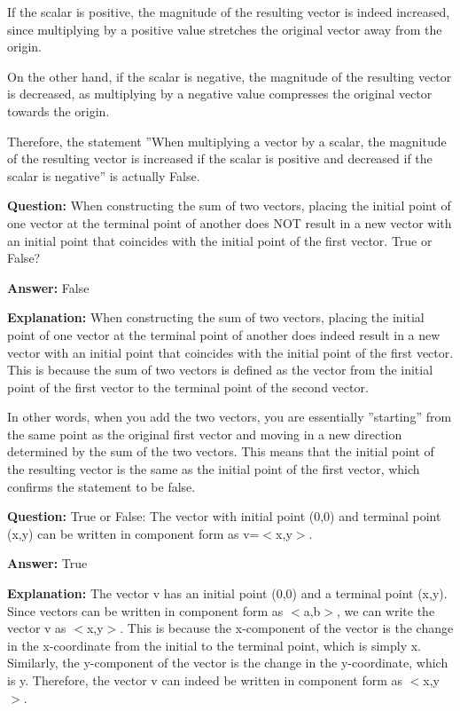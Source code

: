 \documentclass{article}
\begin{document}
If the scalar is positive, the magnitude of the resulting vector is indeed increased, since multiplying by a positive value stretches the original vector away from the origin.

On the other hand, if the scalar is negative, the magnitude of the resulting vector is decreased, as multiplying by a negative value compresses the original vector towards the origin.

Therefore, the statement ''When multiplying a vector by a scalar, the magnitude of the resulting vector is increased if the scalar is positive and decreased if the scalar is negative'' is actually False.
                
                \vspace{0.5cm} 
        
            
                \textbf {Question:} When constructing the sum of two vectors, placing the initial point of one vector at the terminal point of another does NOT result in a new vector with an initial point that coincides with the initial point of the first vector. True or False?
                
                \textbf{Answer:} False

                \textbf{Explanation:} When constructing the sum of two vectors, placing the initial point of one vector at the terminal point of another does indeed result in a new vector with an initial point that coincides with the initial point of the first vector. This is because the sum of two vectors is defined as the vector from the initial point of the first vector to the terminal point of the second vector.

In other words, when you add the two vectors, you are essentially ''starting'' from the same point as the original first vector and moving in a new direction determined by the sum of the two vectors. This means that the initial point of the resulting vector is the same as the initial point of the first vector, which confirms the statement to be false.
                
                \vspace{0.5cm} 
        
            
                \textbf {Question:} True or False: The vector with initial point (0,0) and terminal point (x,y) can be written in component form as v=\ensuremath{<}x,y\ensuremath{>}.
                
                \textbf{Answer:} True

                \textbf{Explanation:} The vector v has an initial point (0,0) and a terminal point (x,y). Since vectors can be written in component form as \ensuremath{<}a,b\ensuremath{>}, we can write the vector v as \ensuremath{<}x,y\ensuremath{>}. This is because the x-component of the vector is the change in the x-coordinate from the initial to the terminal point, which is simply x. Similarly, the y-component of the vector is the change in the y-coordinate, which is y. Therefore, the vector v can indeed be written in component form as \ensuremath{<}x,y\ensuremath{>}.
                
\end{document}
